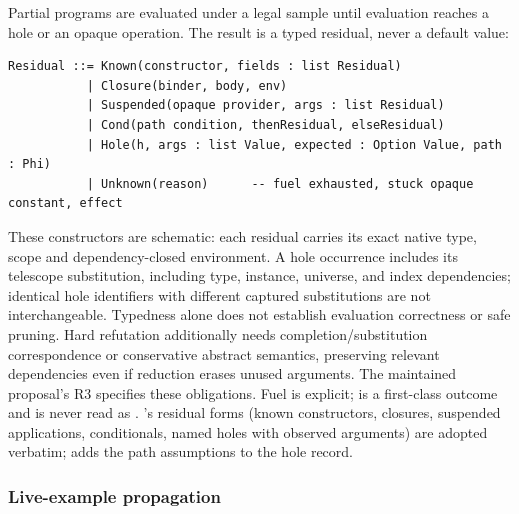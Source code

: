 Partial programs are evaluated under a legal sample until evaluation reaches a hole or an opaque operation. The result is a typed residual, never a default value:
\begin{lstlisting}
Residual ::= Known(constructor, fields : list Residual)
           | Closure(binder, body, env)
           | Suspended(opaque provider, args : list Residual)
           | Cond(path condition, thenResidual, elseResidual)
           | Hole(h, args : list Value, expected : Option Value, path : Phi)
           | Unknown(reason)      -- fuel exhausted, stuck opaque constant, effect
\end{lstlisting}
These constructors are schematic: each residual carries its exact native type, scope and dependency-closed environment. A hole occurrence includes its telescope substitution, including type, instance, universe, and index dependencies; identical hole identifiers with different captured substitutions are not interchangeable. Typedness alone does not establish evaluation correctness or safe pruning. Hard refutation additionally needs completion/substitution correspondence or conservative abstract semantics, preserving relevant dependencies even if reduction erases unused arguments. The maintained proposal's R3 specifies these obligations. Fuel is explicit;  is a first-class outcome and is never read as . 's residual forms (known constructors, closures, suspended applications, conditionals, named holes with observed arguments) are adopted verbatim;  adds the path assumptions to the hole record.

\subsubsection{Live-example propagation}


